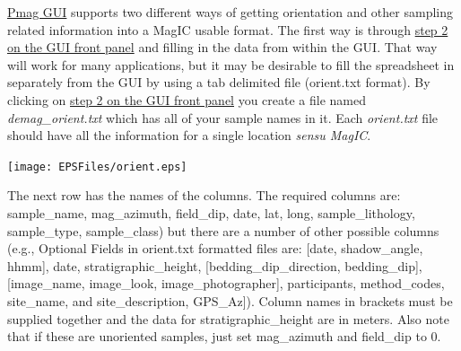 \documentclass[11pt]{book}
\begin{document}
{\href{#pmag_gui.py}{Pmag GUI}  supports two different ways of getting orientation and other sampling related information into a MagIC usable format.  The first way is through \href{#orient}{step 2 on the GUI front panel} and filling in the data from within the GUI.  That way will work for many applications, but it may be desirable to fill the spreadsheet in separately from the GUI by using  a tab delimited file (orient.txt format).   By clicking on  \href{#orient}{step 2 on the GUI front panel}  you create a file named {\it demag\_orient.txt}  which has all of your sample names in it.   Each {\it orient.txt} file should  have all the information for a single location {\it sensu MagIC}.


  \texttt{[image: EPSFiles/orient.eps]}

 The next row has the names of the columns.  The required columns are:  sample\_name, mag\_azimuth, field\_dip, date, lat, long, sample\_lithology, sample\_type, sample\_class) but there are a number of other possible columns (e.g., Optional Fields in orient.txt formatted files are: [date, shadow\_angle, hhmm], date, stratigraphic\_height, [bedding\_dip\_direction, bedding\_dip], [image\_name, image\_look, image\_photographer], participants, method\_codes, site\_name, and site\_description, GPS\_Az]).  Column names in brackets must be supplied together and the data for stratigraphic\_height are in meters.  Also note that if these are unoriented samples, just set mag\_azimuth and field\_dip to 0.


}
\end{document}
